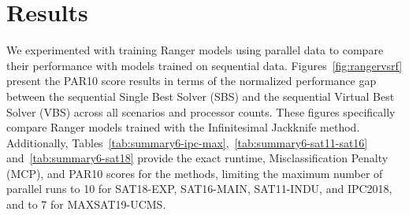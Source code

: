\section{Results}

We experimented with training Ranger models using parallel data to compare their performance with models trained on sequential data. Figures~\ref{fig:rangervsrf} present the PAR10 score results in terms of the normalized performance gap between the sequential Single Best Solver (SBS) and the sequential Virtual Best Solver (VBS) across all scenarios and processor counts. These figures specifically compare Ranger models trained with the Infinitesimal Jackknife method. Additionally, Tables~\ref{tab:summary6-ipc-max},~\ref{tab:summary6-sat11-sat16} and~\ref{tab:summary6-sat18} provide the exact runtime, Misclassification Penalty (MCP), and PAR10 scores for the methods, limiting the maximum number of parallel runs to 10 for SAT18-EXP, SAT16-MAIN, SAT11-INDU, and IPC2018, and to 7 for MAXSAT19-UCMS.

